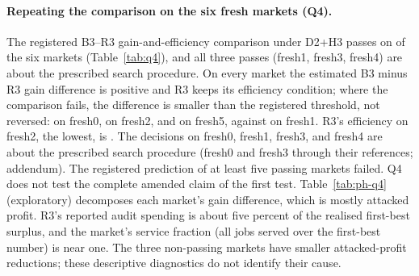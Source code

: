 \documentclass[11pt]{article}
\begin{document}
\begin{table}[t]\centering\small
{}
\caption{Q1: pooled difference in attacker gain, C$^*$ minus R3, per family, with interval, category, the calibrated two-sided $p$-value that enters Holm ($p'$) and its Holm-adjusted value, and efficiency label.}\label{tab:q1}
\end{table}

\paragraph{Repeating the comparison on the six fresh markets (Q4).} The registered B3--R3 gain-and-efficiency comparison under D2+H3 passes on  of the six markets (Table~\ref{tab:q4}), and all three passes (fresh1, fresh3, fresh4) are about the prescribed search procedure. On every market the estimated B3 minus R3 gain difference is positive and R3 keeps its efficiency condition; where the comparison fails, the difference is smaller than the registered threshold, not reversed:  on fresh0,  on fresh2, and  on fresh5, against  on fresh1. R3's efficiency on fresh2, the lowest, is . The decisions on fresh0, fresh1, fresh3, and fresh4 are about the prescribed search procedure (fresh0 and fresh3 through their references; addendum). The registered prediction of at least five passing markets failed. Q4 does not test the complete amended claim of the first test. Table~\ref{tab:ph-q4} (exploratory) decomposes each market's gain difference, which is mostly attacked profit. R3's reported audit spending is about five percent of the realised first-best surplus, and the market's service fraction (all jobs served over the first-best number) is near one. The three non-passing markets have smaller attacked-profit reductions; these descriptive diagnostics do not identify their cause.

\begin{table}[t]\centering\small
{}
\caption{Q4 per market: B3 minus R3 gain difference and its calibrated lower bound, R3's efficiency and lower bound, the raw one-sided bootstrap $p$-values of the two components, the calibrated market value $\max(p'_{\mathrm{gain}}, p'_{\mathrm{eff}})$ that enters Holm, its Holm-adjusted value, and the decision. The decisions on fresh0, fresh1, fresh3, and fresh4 are about the prescribed search procedure; the Decision column marks the direct flags (fresh1, fresh4) and the flags fresh0 and fresh3 inherit through their references (addendum).}\label{tab:q4}
\end{table}
\end{document}
